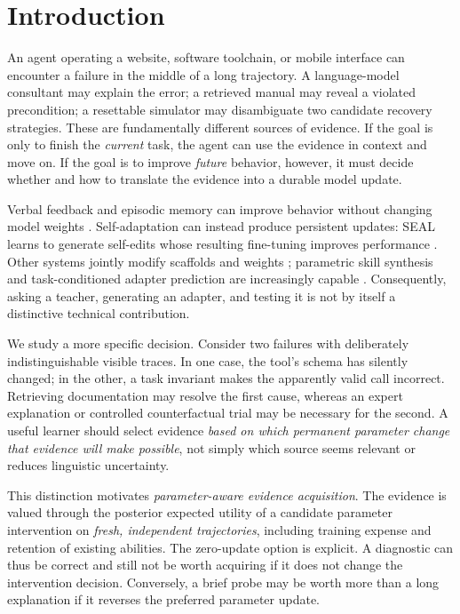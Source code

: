 \section{Introduction}
\label{sec:introduction}

An agent operating a website, software toolchain, or mobile interface can
encounter a failure in the middle of a long trajectory. A language-model
consultant may explain the error; a retrieved manual may reveal a violated
precondition; a resettable simulator may disambiguate two candidate recovery
strategies. These are fundamentally different sources of evidence.
If the goal is only to finish the \emph{current} task, the agent can use the
evidence in context and move on. If the goal is to improve \emph{future}
behavior, however, it must decide whether and how to translate the evidence
into a durable model update.

Verbal feedback and episodic memory can improve behavior without changing
model weights \citep{shinn2023reflexion}. Self-adaptation can instead produce
persistent updates: SEAL learns to generate self-edits whose resulting
fine-tuning improves performance \citep{zweiger2025seal}. Other systems jointly
modify scaffolds and weights \citep{hebbar2026sia}; parametric skill synthesis
and task-conditioned adapter prediction are increasingly capable
\citep{dery2026skillsmith,han2026kvskill,khan2026distributional}.
Consequently, asking a teacher, generating an adapter, and testing it is not
by itself a distinctive technical contribution.

We study a more specific decision. Consider two failures with deliberately
indistinguishable visible traces. In one case, the tool's schema has silently
changed; in the other, a task invariant makes the apparently valid call
incorrect. Retrieving documentation may resolve the first cause, whereas an
expert explanation or controlled counterfactual trial may be necessary for
the second. A useful learner should select evidence \emph{based on which
permanent parameter change that evidence will make possible}, not simply
which source seems relevant or reduces linguistic uncertainty.

This distinction motivates \emph{parameter-aware evidence acquisition}.
The evidence is valued through the posterior expected utility of a candidate
parameter intervention on \emph{fresh, independent trajectories}, including
training expense and retention of existing abilities. The zero-update
option is explicit. A diagnostic can thus be correct and still not be worth
acquiring if it does not change the intervention decision. Conversely, a
brief probe may be worth more than a long explanation if it reverses the
preferred parameter update.

